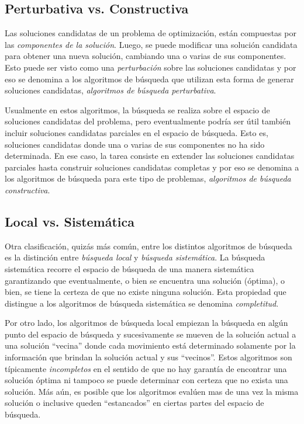 \subsection{Perturbativa vs. Constructiva}

Las soluciones candidatas de un problema de optimizaci\'on, est\'an compuestas
por las \textit{componentes de la soluci\'on}. Luego, se puede modificar una
soluci\'on candidata para obtener una nueva soluci\'on, cambiando una o varias
de sus componentes. Esto puede ser visto como una \textit{perturbaci\'on} sobre
las soluciones candidatas y por eso se denomina a los algoritmos de b\'usqueda
que utilizan esta forma de generar soluciones candidatas, \textit{algoritmos de
b\'usqueda perturbativa}.

Usualmente en estos algoritmos, la b\'usqueda se realiza sobre el espacio de
soluciones candidatas del problema, pero eventualmente podr\'ia ser \'util
tambi\'en incluir soluciones candidatas parciales en el espacio de b\'usqueda.
Esto es, soluciones candidatas donde una o varias de sus componentes no ha sido
determinada. En ese caso, la tarea consiste en extender las soluciones
candidatas parciales hasta construir soluciones candidatas completas y por eso
se denomina a los algoritmos de b\'usqueda para este tipo de problemas,
\textit{algoritmos de b\'usqueda constructiva}.

\subsection{Local vs. Sistem\'atica}

Otra clasificaci\'on, quiz\'as m\'as com\'un, entre los distintos algoritmos de
b\'usqueda es la distinci\'on entre \textit{b\'usqueda local} y
\textit{b\'usqueda sistem\'atica}. La b\'usqueda sistem\'atica recorre el
espacio de b\'usqueda de una manera sistem\'atica garantizando que
eventualmente, o bien se encuentra una soluci\'on (\'optima), o bien, se tiene
la certeza de que no existe ninguna soluci\'on. Esta propiedad que distingue a
los algoritmos de b\'usqueda sistem\'atica se denomina \textit{completitud}.

Por otro lado, los algoritmos de b\'usqueda local empiezan la b\'usqueda en
alg\'un punto del espacio de b\'usqueda y sucesivamente se mueven de la
soluci\'on actual a una soluci\'on ``vecina'' donde cada movimiento est\'a
determinado solamente por la informaci\'on que brindan la soluci\'on actual y
sus ``vecinos''. Estos algoritmos son t\'ipicamente \textit{incompletos} en el
sentido de que no hay garant\'ia de encontrar una soluci\'on \'optima ni tampoco
se puede determinar con certeza que no exista una soluci\'on. M\'as a\'un, es
posible que los algoritmos eval\'uen mas de una vez la misma soluci\'on o
inclusive queden ``estancados'' en ciertas partes del espacio de b\'usqueda.

